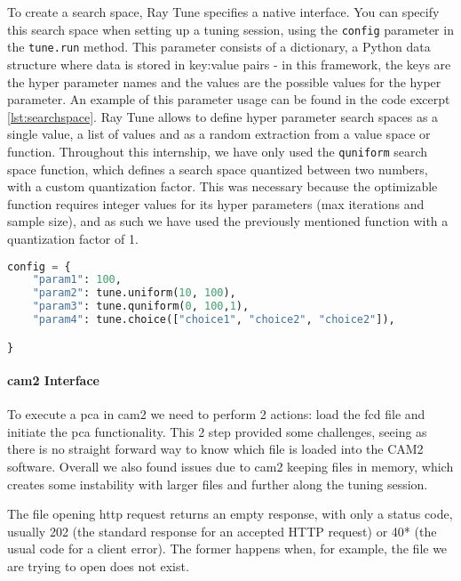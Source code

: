 To create a search space, Ray Tune specifies a native interface. You can specify this search space when setting up a tuning session, using the \verb!config! parameter in the \verb!tune.run! method. This parameter consists of a dictionary, a Python data structure where data is stored in key:value pairs - in this framework, the keys are the hyper parameter names and the values are the possible values for the hyper parameter. An example of this parameter usage can be found in the code excerpt \ref{lst:searchspace}. Ray Tune allows to define hyper parameter search spaces as a single value, a list of values and as a random extraction from a value space or function. Throughout this internship, we have only used the \verb!quniform! search space function, which defines a search space quantized between two numbers, with a custom quantization factor. This was necessary because the optimizable function requires integer values for its hyper parameters (max iterations and sample size), and as such we have used the previously mentioned function with a quantization factor of 1.


\begin{lstlisting}[language=Python, caption=Example Search Space configuration, captionpos=b, label={lst:searchspace}]
config = {
    "param1": 100,
    "param2": tune.uniform(10, 100),
    "param3": tune.quniform(0, 100,1),
    "param4": tune.choice(["choice1", "choice2", "choice2"]),

}
\end{lstlisting}

\paragraph{\acrshort{cam2} Interface}

To execute a \acrshort{pca} in \acrshort{cam2} we need to perform 2 actions: load the \acrshort{fcd} file and initiate the \acrshort{pca} functionality. This 2 step provided some challenges, seeing as there is no straight forward way to know which file is loaded into the CAM2 software. Overall we also found issues due to \acrshort{cam2} keeping files in memory, which creates some instability with larger files and further along the tuning session.

The file opening \acrshort{http} request returns an empty response, with only a status code, usually 202 (the standard response for an accepted HTTP request) or 40* (the usual code for a client error). The former happens when, for example, the file we are trying to open does not exist.

